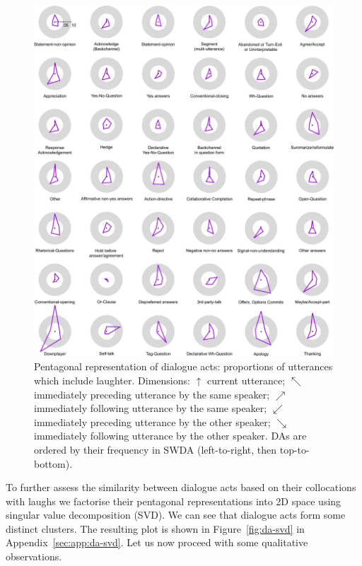 \documentclass[11pt,a4paper]{article}
\begin{document}
\begin{figure}[h!]
  \centering
  \includegraphics[width=\linewidth]{img/multiorbit.pdf}
  \caption{Pentagonal representation of dialogue acts: proportions of utterances which include laughter. Dimensions:
$\uparrow$ current utterance;
$\nwarrow$ immediately preceding utterance by the same speaker;
$\nearrow$ immediately following utterance by the same speaker;
$\swarrow$ immediately preceding utterance by the other speaker;
$\searrow$ immediately following utterance by the other speaker.
DAs are ordered by their frequency in SWDA (left-to-right, then top-to-bottom).
    \label{fig:da-orbits}}
\vspace*{-0.5cm}
\end{figure}

To further assess the similarity between dialogue acts based on their
collocations with laughs we factorise their pentagonal representations
into 2D space using singular value decomposition (SVD). We can see
that dialogue acts form some distinct clusters.
The resulting plot is
shown in Figure~\ref{fig:da-svd} in Appendix~\ref{sec:app:da-svd}. Let
us now proceed with some qualitative observations.
\end{document}
